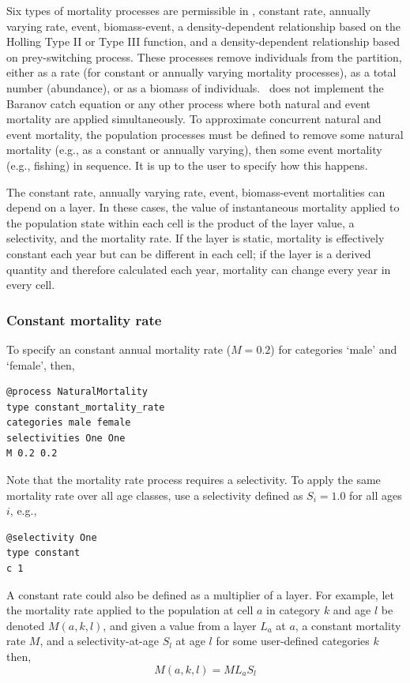Six types of mortality processes are permissible in \SPM, constant rate, annually varying rate, event, biomass-event, a density-dependent relationship based on the Holling \citep{Holling1959} Type II or Type III function, and a density-dependent relationship based on prey-switching process. These processes remove individuals from the partition, either as a rate (for constant or annually varying mortality processes), as a total number (abundance), or as a biomass of individuals. \SPM\ does not implement the Baranov catch equation or any other process where both natural and event mortality are applied simultaneously. To approximate concurrent natural and event mortality, the population processes must be defined to remove some natural mortality (e.g., as a constant or annually varying), then some event mortality (e.g., fishing) in sequence. It is up to the user to specify how this happens.

The constant rate, annually varying rate, event, biomass-event mortalities can depend on a layer. In these cases, the value of instantaneous mortality applied to the population state within each cell is the product of the layer value, a selectivity, and the mortality rate. If the layer is static, mortality is effectively constant each year but can be different in each cell; if the layer is a derived quantity and therefore calculated each year, mortality can change every year in every cell.

\subsubsection*{Constant mortality rate}

To specify an constant annual mortality rate ($M=0.2$) for categories `male' and `female', then, 

{\small{\begin{verbatim}
@process NaturalMortality
type constant_mortality_rate
categories male female
selectivities One One
M 0.2 0.2
\end{verbatim}}}

Note that the mortality rate process requires a selectivity. To apply the same mortality rate over all age classes, use a selectivity defined as $S_i=1.0$ for all ages $i$, e.g.,

{\small{\begin{verbatim}
@selectivity One
type constant
c 1
\end{verbatim}}}

A constant rate could also be defined as a multiplier of a layer. For example, let the mortality rate applied to the population at cell $a$ in category $k$ and age $l$ be denoted $M(a,k,l)$, and given a value from a layer $L_a$  at $a$, a constant mortality rate $M$, and a selectivity-at-age $S_l$ at age $l$ for some user-defined categories $k$ then, 
\begin{equation}
  M(a,k,l) = ML_a S_l 
\end{equation}


